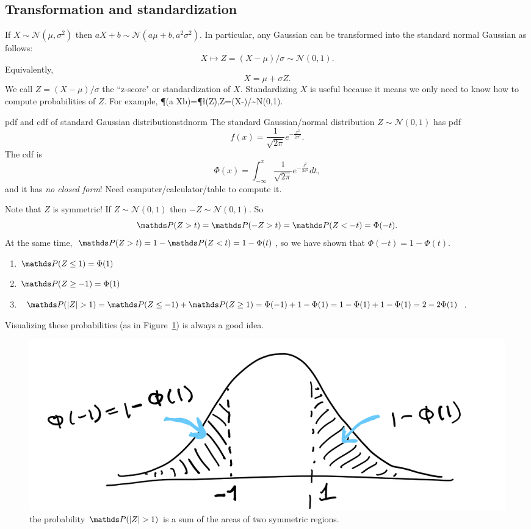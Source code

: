 \documentclass[11pt]{article}
\begin{document}
\subsection{Transformation and standardization}If $X\sim\mathcal N(\mu,\sigma^2)$ then $aX+b\sim\mathcal N(a\mu+b, a^2\sigma^2).$ In particular, any Gaussian can be transformed into the standard normal Gaussian as follows: $$X\mapsto Z=(X-\mu)/\sigma\sim\mathcal N(0,1).$$ Equivalently,
$$X=\mu+\sigma Z.$$
We call $Z=(X-\mu)/\sigma$ the ``z-score" or standardization of $X$. Standardizing $X$ is useful because it means we only need to know how to compute probabilities of $Z$. For example,
\beq\P(a \leq X\leq b)=\P\l(\leq Z\leq {}\r),\quad Z=(X-\mu)/\sigma\sim\mathcal N(0,1).\eeq
\begin{defn}{pdf and cdf of standard Gaussian distribution}{stdnorm}
The standard Gaussian/normal distribution $Z\sim\mathcal N(0,1)$ has pdf
$$f(x)=\frac{1}{\sqrt{2\pi}}e^{-\frac{x^2}{2\sigma^2}}.$$ The cdf is
$$\Phi(x)=\int_{-\infty}^x\frac{1}{\sqrt{2\pi}}e^{-\frac{t^2}{2\sigma^2}}dt,$$ and it has \emph{no closed form}! Need computer/calculator/table to compute it. 
\end{defn}
Note that $Z$ is symmetric! If $Z\sim\mathcal N(0,1)$ then $-Z\sim\mathcal N(0,1)$. So 
$$\P(Z>t)=\P(-Z>t)=\P(Z<-t)=\Phi(-t).$$ At the same time, $\P(Z>t)=1-\P(Z<t)=1-\Phi(t)$, so we have shown that $\Phi(-t)=1-\Phi(t)$.  
\begin{example}
\begin{enumerate}
\item $\P(Z\leq1)=\Phi(1)$
\item $\P(Z\geq-1)=\Phi(1)$
\item $\P(|Z|>1) = \P(Z\leq-1)+\P(Z\geq1) =\Phi(-1) + 1-\Phi(1)= 1-\Phi(1)+1-\Phi(1)=2-2\Phi(1)$. 
\end{enumerate} 
Visualizing these probabilities (as in Figure~\ref{fig:2edge}) is always a good idea. 
\end{example}
\begin{figure}[h]
    \center
    \vspace{-10pt}
    \includegraphics[scale=0.15]{Images/twoedge.png}
        \caption{the probability $\P(|Z|>1)$ is a sum of the areas of two symmetric regions.}
    \label{fig:2edge}
\end{figure}
\end{document}
